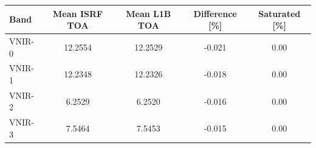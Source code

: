 \begin{tabular}{lcccc}
\toprule
Band & Mean ISRF TOA & Mean L1B TOA & Difference [\%] & Saturated [\%] \\
\midrule
VNIR-0 & 12.2554 & 12.2529 & -0.021 & 0.00 \\
VNIR-1 & 12.2348 & 12.2326 & -0.018 & 0.00 \\
VNIR-2 & 6.2529 & 6.2520 & -0.016 & 0.00 \\
VNIR-3 & 7.5464 & 7.5453 & -0.015 & 0.00 \\
\bottomrule
\end{tabular}
